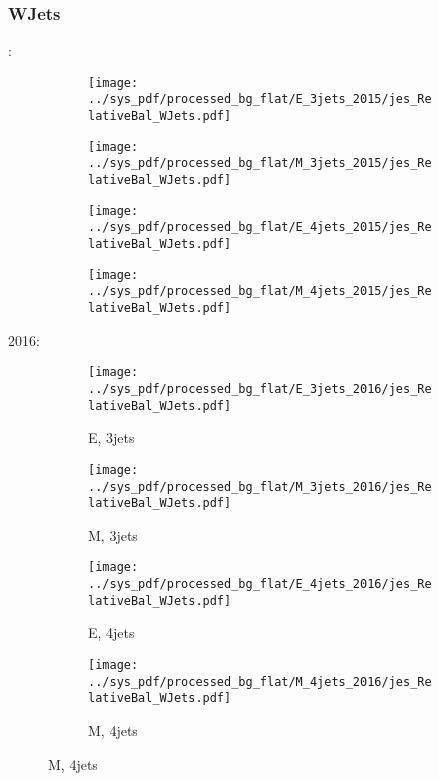 \documentclass{beamer}
\begin{document}
\begin{frame}
\frametitle{WJets}
\fontsize{5}{1}:
\begin{figure}
\centering
\begin{subfigure}[b]{0.24\textwidth}
\texttt{[image: ../sys\_pdf/processed\_bg\_flat/E\_3jets\_2015/jes\_RelativeBal\_WJets.pdf]}
\end{subfigure}
\begin{subfigure}[b]{0.24\textwidth}
\texttt{[image: ../sys\_pdf/processed\_bg\_flat/M\_3jets\_2015/jes\_RelativeBal\_WJets.pdf]}
\end{subfigure}
\begin{subfigure}[b]{0.24\textwidth}
\texttt{[image: ../sys\_pdf/processed\_bg\_flat/E\_4jets\_2015/jes\_RelativeBal\_WJets.pdf]}
\end{subfigure}
\begin{subfigure}[b]{0.24\textwidth}
\texttt{[image: ../sys\_pdf/processed\_bg\_flat/M\_4jets\_2015/jes\_RelativeBal\_WJets.pdf]}
\end{subfigure}
\end{figure}
2016:
\begin{figure}
\centering
\begin{subfigure}[b]{0.24\textwidth}
\texttt{[image: ../sys\_pdf/processed\_bg\_flat/E\_3jets\_2016/jes\_RelativeBal\_WJets.pdf]}
\captionsetup{font=tiny}
\caption{E, 3jets}
\end{subfigure}
\begin{subfigure}[b]{0.24\textwidth}
\texttt{[image: ../sys\_pdf/processed\_bg\_flat/M\_3jets\_2016/jes\_RelativeBal\_WJets.pdf]}
\captionsetup{font=tiny}
\caption{M, 3jets}
\end{subfigure}
\begin{subfigure}[b]{0.24\textwidth}
\texttt{[image: ../sys\_pdf/processed\_bg\_flat/E\_4jets\_2016/jes\_RelativeBal\_WJets.pdf]}
\captionsetup{font=tiny}
\caption{E, 4jets}
\end{subfigure}
\begin{subfigure}[b]{0.24\textwidth}
\texttt{[image: ../sys\_pdf/processed\_bg\_flat/M\_4jets\_2016/jes\_RelativeBal\_WJets.pdf]}
\captionsetup{font=tiny}
\caption{M, 4jets}
\end{subfigure}
\end{figure}
\end{frame}
\end{document}
